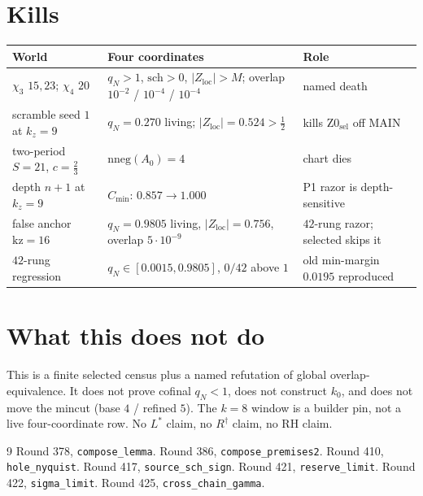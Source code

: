 \documentclass[11pt]{article}
\theoremstyle{remark}
\newcommand{\Zloc}{Z_{\mathrm{loc}}}
\newcommand{\Cmin}{C_{\min}}
\begin{document}
\section{Kills}\label{sec:kills}

\begin{center}
\small
\begin{tabular}{@{}lll@{}}
\toprule
World & Four coordinates & Role \\
\midrule
$\chi_3$ $15,23$; $\chi_4$ $20$ &
  $q_N>1$, $\mathrm{sch}>0$, $\lvert\Zloc\rvert>M$;
  overlap $10^{-2}$ / $10^{-4}$ / $10^{-4}$ &
  named death \\
scramble seed $1$ at $k_z=9$ &
  $q_N=0.270$ living;
  $\lvert\Zloc\rvert=0.524>\tfrac12$ &
  kills $\mathrm{Z0_{sel}}$ off MAIN \\
two-period $S=21$, $c=\tfrac23$ &
  $\mathrm{nneg}(A_0)=4$ & chart dies \\
depth $n+1$ at $k_z=9$ &
  $\Cmin$: $0.857\to 1.000$ &
  P1 razor is depth-sensitive \\
false anchor $\mathrm{kz}=16$ &
  $q_N=0.9805$ living, $\lvert\Zloc\rvert=0.756$,
  overlap $5\cdot 10^{-9}$ &
  $42$-rung razor; selected skips it \\
$42$-rung regression &
  $q_N\in[0.0015,0.9805]$, $0/42$ above $1$ &
  old min-margin $0.0195$ reproduced \\
\bottomrule
\end{tabular}
\end{center}

\section{What this does not do}\label{sec:not}

This is a finite selected census plus a named
refutation of global overlap-equivalence.
It does not prove cofinal $q_N<1$, does not
construct $k_0$, and does not move the mincut
(base $4$ / refined $5$).
The $k=8$ window is a builder pin, not a live
four-coordinate row.
No $L^{*}$ claim, no $R^{\dagger}$ claim, no RH claim.

\begin{thebibliography}{9}
 Round 378, \texttt{compose\_lemma}.
 Round 386, \texttt{compose\_premises2}.
 Round 410, \texttt{hole\_nyquist}.
 Round 417, \texttt{source\_sch\_sign}.
 Round 421, \texttt{reserve\_limit}.
 Round 422, \texttt{sigma\_limit}.
 Round 425, \texttt{cross\_chain\_gamma}.
\end{thebibliography}
\end{document}

